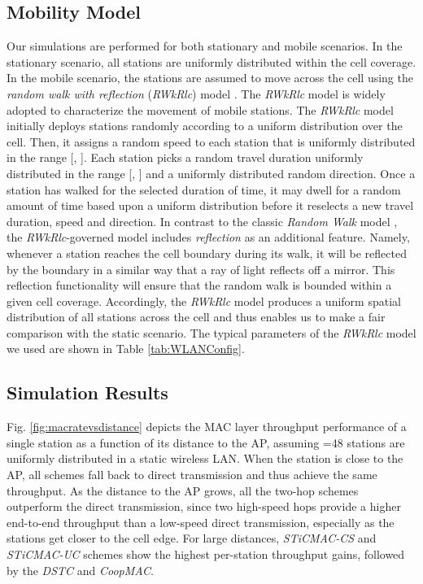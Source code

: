 \documentclass[peerreview,draftcls,onecolumn,12pt,a4paper]{IEEEtran}
\begin{document}
\vspace{-0.15in}
\subsection{Mobility Model} \label{mobilitymodel} 
\vspace{-0.05in}

Our simulations are performed for both
stationary and mobile scenarios. In the stationary scenario, all
stations are uniformly distributed within the cell coverage. In the mobile scenario, the stations are assumed to move across
the cell using the \emph{random walk with reflection}
(\emph{RWkRlc}) model \cite{McGuire}. The \emph{RWkRlc} model is
widely adopted to characterize the movement of
mobile stations. The \emph{RWkRlc} model initially deploys
stations randomly according to a uniform distribution over the
cell. Then, it assigns a random speed to each station that is
uniformly distributed in the range [, ].
Each station picks a random travel duration uniformly distributed
in the range [, ] and a uniformly distributed random direction. Once a station has walked
for the selected duration of time, it may dwell for a random
amount of time  based upon a uniform distribution before it
reselects a new travel duration, speed and direction. In
contrast to the classic \emph{Random Walk} model
\cite{mobilitymodel}, the \emph{RWkRlc}-governed model includes
\emph{reflection} as an additional feature. Namely, whenever a
station reaches the cell boundary during its walk, it will be
reflected by the boundary in a similar way that a ray of light
reflects off a mirror. This reflection functionality will ensure
that the random walk is bounded within a given   cell coverage.
Accordingly,  the \emph{RWkRlc} model produces a uniform spatial
distribution of all stations across the cell and thus enables us
to make a fair comparison with the static scenario. The typical parameters of the \emph{RWkRlc} model we used
are shown in Table \ref{tab:WLANConfig}.

\vspace{-0.15in}
\subsection{Simulation Results} \label{simulationresult}
\vspace{-0.05in}

Fig. \ref{fig:macratevsdistance} depicts the MAC layer throughput
performance of a single station as a function of its distance to
the AP, assuming =48 stations are uniformly distributed in a
static wireless LAN. When the station is close to the AP, all
schemes fall back to direct transmission  and thus achieve the
same throughput. As the distance to the AP grows, all
the two-hop schemes outperform the direct transmission, since two
high-speed hops provide a higher end-to-end throughput than a
low-speed direct transmission, especially as the stations get
closer to the cell edge. For large distances, \emph{STiCMAC-CS}
and \emph{STiCMAC-UC} schemes show the highest per-station
throughput gains, followed by the \emph{DSTC} and \emph{CoopMAC}.
\end{document}
